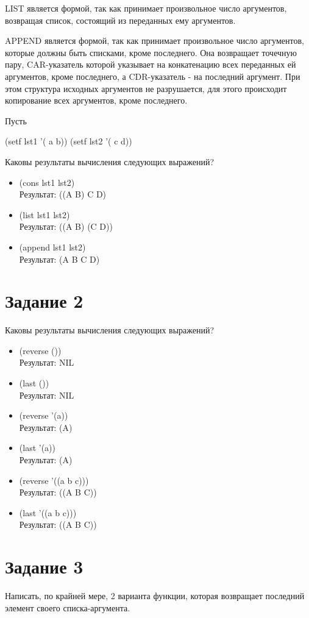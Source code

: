 \documentclass[a4paper, 12pt]{article}
\begin{document}
LIST является формой, так как принимает произвольное число аргументов, возвращая список, состоящий из переданных ему аргументов.

APPEND является формой, так как принимает произвольное число аргументов, которые должны быть списками, кроме последнего. Она возвращает точечную пару, CAR-указатель которой указывает на конкатенацию всех переданных ей аргументов, кроме последнего, а CDR-указатель - на последний аргумент. При этом структура исходных аргументов не разрушается, для этого происходит копирование всех аргументов, кроме последнего. 

Пусть

(setf lst1 '( a b)) (setf lst2 '( c d))

Каковы результаты вычисления следующих выражений?
\begin{itemize}
	\item (cons lst1 lst2)\\
	Результат: ((A B) C D)
	\item (list lst1 lst2)\\
	Результат: ((A B) (C D))
	\item (append lst1 lst2)\\
	Результат: (A B C D)\\
\end{itemize}

\section*{Задание 2}
Каковы результаты вычисления следующих выражений?
\begin{itemize}
	\item (reverse ())\\
	Результат: NIL
	\item (last ())\\
	Результат: NIL
	\item (reverse '(a))\\
	Результат: (A)
	\item (last '(a))\\
	Результат: (A)
	\item (reverse '((a b c)))\\
	Результат: ((A B C))
	\item (last '((a b c)))\\
	Результат: ((A B C))\\
\end{itemize}

\section*{Задание 3}
Написать, по крайней мере, 2 варианта функции, которая возвращает последний элемент своего списка-аргумента.
\end{document}
